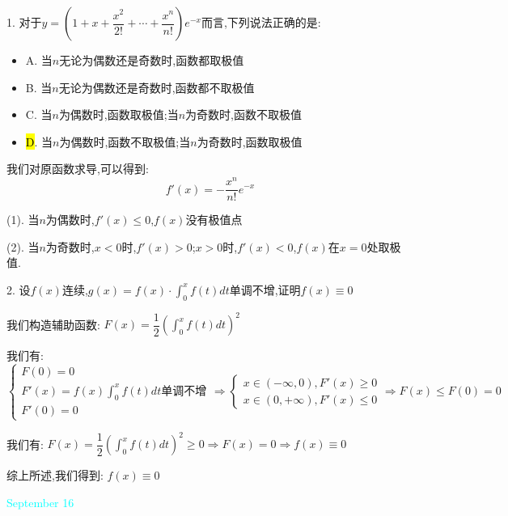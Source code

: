 1. 对于$y=\left(1+x+\dfrac{x^2}{2!}+\cdots+\dfrac{x^n}{n!} \right)e^{-x}$而言,下列说法正确的是:  
\begin{itemize}
	\item A. 当$n$无论为偶数还是奇数时,函数都取极值
	\item B. 当$n$无论为偶数还是奇数时,函数都不取极值
	\item C. 当$n$为偶数时,函数取极值;当$n$为奇数时,函数不取极值
	\item \hl{D}. 当$n$为偶数时,函数不取极值;当$n$为奇数时,函数取极值
\end{itemize}
\begin{solution}

	我们对原函数求导,可以得到:  
	$$f'(x)=-\dfrac{x^{n}}{n!}e^{-x}$$
	
	(1). 当$n$为偶数时,$f'(x)\leq 0$,$f(x)$没有极值点
	
	(2). 当$n$为奇数时,$x<0$时,$f'(x)>0$;$x>0$时,$f'(x)<0$,$f(x)$在$x=0$处取极值.
\end{solution}

2. 设$f(x)$连续,$g(x)=f(x)\cdot\int_{0}^{x}f(t)dt$单调不增,证明$f(x)\equiv 0$
\begin{solution}

	我们构造辅助函数:  $F(x)=\dfrac{1}{2}\left(\int_{0}^{x}f(t)dt \right)^2$
	
	我们有:  $$\left\lbrace
	\begin{array}{l}
		F(0)=0\\
		F'(x)=f(x)\int_{0}^{x}f(t)dt\text{单调不增}\\
		F'(0)=0
	\end{array}
	\right. \Rightarrow \left\lbrace
	\begin{array}{l}
		x\in(-\infty,0),F'(x)\geq 0\\
		x\in(0,+\infty),F'(x)\leq 0
	\end{array}
	\right. \Rightarrow F(x)\leq F(0)=0$$
	
	我们有:  $F(x)=\dfrac{1}{2}\left(\int_{0}^{x}f(t)dt \right)^2\geq 0\Rightarrow F(x)=0\Rightarrow f(x)\equiv 0$
	
	综上所述,我们得到:  $f(x)\equiv 0$
\end{solution}

\textcolor{cyan}{September 16}

